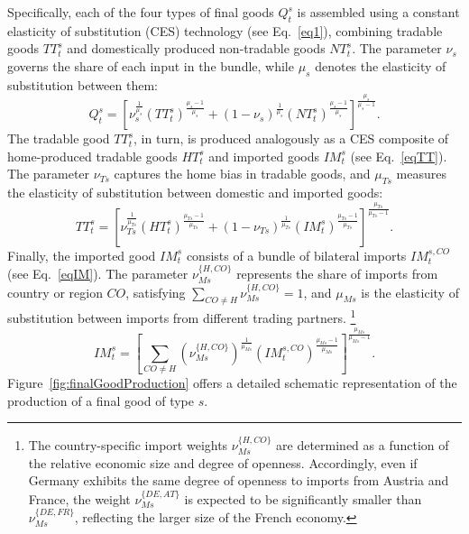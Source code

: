 \documentclass[a4paper,11pt]{article}
\numberwithin{equation}{section}
\begin{document}
Specifically, each of the four types of final goods $Q_t^s$ is assembled using a constant elasticity of substitution (CES) technology (see Eq.~\ref{eq1}), combining tradable goods $TT_t^s$ and domestically produced non-tradable goods $NT_t^s$. The parameter $\nu_s$ governs the share of each input in the bundle, while $\mu_s$ denotes the elasticity of substitution between them:
\begin{equation}
    \label{eq1}
    Q_t^s = \left[\nu_s^{\frac{1}{\mu_s}}\left(TT_t^s\right)^{\frac{\mu_s-1}{\mu_s}} + \left(1-\nu_s\right)^{\frac{1}{\mu_s}}\left(NT_t^s\right)^{\frac{\mu_s-1}{\mu_s}}\right]^{\frac{\mu_s}{\mu_s-1}}.
\end{equation}
The tradable good $TT_t^s$, in turn, is produced analogously as a CES composite of home-produced tradable goods $HT_t^s$ and imported goods $IM_t^s$ (see Eq.~\ref{eqTT}). The parameter $\nu_{Ts}$ captures the home bias in tradable goods, and $\mu_{Ts}$ measures the elasticity of substitution between domestic and imported goods:
\begin{equation}
    \label{eqTT}
    TT_t^s = \left[\nu_{Ts}^{\frac{1}{\mu_{Ts}}}\left(HT_t^s\right)^{\frac{\mu_{Ts}-1}{\mu_{Ts}}} + \left(1-\nu_{Ts}\right)^{\frac{1}{\mu_{Ts}}}\left(IM_t^s\right)^{\frac{\mu_{Ts}-1}{\mu_{Ts}}}\right]^{\frac{\mu_{Ts}}{\mu_{Ts}-1}}.
\end{equation}
Finally, the imported good $IM_t^s$ consists of a bundle of bilateral imports $IM_t^{s,CO}$ (see Eq.~\ref{eqIM}). The parameter $\nu_{Ms}^{\{H,CO\}}$ represents the share of imports from country or region $CO$, satisfying $\sum_{CO \neq H} \nu_{Ms}^{\{H,CO\}} = 1$, and $\mu_{Ms}$ is the elasticity of substitution between imports from different trading partners.
\footnote{
    The country-specific import weights $\nu_{Ms}^{\{H,CO\}}$ are determined as a function of the relative economic size and degree of openness. 
    Accordingly, even if Germany exhibits the same degree of openness to imports from Austria and France, the weight $\nu_{Ms}^{\{DE,AT\}}$ is expected to be significantly smaller than $\nu_{Ms}^{\{DE,FR\}}$, reflecting the larger size of the French economy.
}
\begin{equation}
    \label{eqIM}
    IM_t^s = \left[\sum_{CO \neq H} \left(\nu_{Ms}^{\{H,CO\}}\right)^{\frac{1}{\mu_{Ms}}} \left(IM_t^{s,CO}\right)^{\frac{\mu_{Ms}-1}{\mu_{Ms}}}\right]^{\frac{\mu_{Ms}}{\mu_{Ms}-1}}.
\end{equation}
Figure~\ref{fig:finalGoodProduction} offers a detailed schematic representation of the production of a final good of type $s$.
\end{document}
